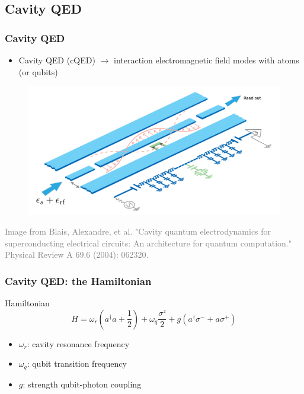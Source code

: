\documentclass[xcolor=dvipsnames,hyperref={CJKbookmarks=true}]{beamer}
\begin{document}
\subsection{Cavity QED}
\begin{frame}
\frametitle{Cavity QED}
\begin{itemize}
\item Cavity QED (cQED) $\rightarrow$ interaction electromagnetic field modes with atoms (or qubits)
\end{itemize}
\begin{figure}
\centering
\includegraphics[width=0.8\linewidth]{cavity.png}
\end{figure}
\tiny{\textcolor{gray}{Image from Blais, Alexandre, et al. "Cavity quantum electrodynamics for superconducting electrical circuits: An architecture for quantum computation." Physical Review A 69.6 (2004): 062320.\cite{blais2004cavity}}}
\end{frame}

\begin{frame}
\frametitle{Cavity QED: the Hamiltonian}
\begin{block}{Hamiltonian}
$$H =  \omega_r \left(a^{\dagger} a+ \dfrac{1}{2} \right) +  \omega_q \dfrac{\sigma^{z}}{2}+  g \left(a^{\dagger}\sigma^{-}+a\sigma^{+}\right)$$
\end{block}
\vspace{0.5cm}
\begin{itemize}
\item $\omega_r$: cavity resonance frequency
\vspace{0.3cm}
\item $\omega_q$: qubit transition frequency
\vspace{0.3cm}
\item $g$: strength qubit-photon coupling
\end{itemize}
\end{frame}
\end{document}
